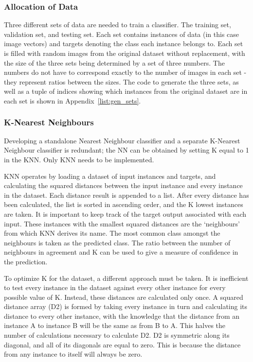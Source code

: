  

\subsubsection{Allocation of Data}

Three different sets of data are needed to train a classifier. The training set, validation set, and testing set. Each set contains instances of data (in this case image vectors) and targets denoting the class each instance belongs to. Each set is filled with random images from the original dataset without replacement, with the size of the three sets being determined by a set of three numbers. The numbers do not have to correspond exactly to the number of images in each set - they represent ratios between the sizes. The code to generate the three sets, as well as a tuple of indices showing which instances from the original dataset are in each set is shown in Appendix~\ref{list:gen_sets}.

\subsubsection{K-Nearest Neighbours}\label{sec:best_k}
Developing a standalone Nearest Neighbour classifier and a separate K-Nearest Neighbour classifier is redundant; the NN can be obtained by setting K equal to 1 in the KNN. Only KNN needs to be implemented.

KNN operates by loading a dataset of input instances and targets, and calculating the squared distances between the input instance and every instance in the dataset. Each distance result is appended to a list. After every distance has been calculated, the list is sorted in ascending order, and the K lowest instances are taken. It is important to keep track of the target output associated with each input. These instances with the smallest squared distances are the `neighbours' from which KNN derives its name. The most common class amongst the neighbours is taken as the predicted class. The ratio between the number of neighbours in agreement and K can be used to give a measure of confidence in the prediction.

To optimize K for the dataset, a different approach must be taken. It is inefficient to test every instance in the dataset against every other instance for every possible value of K. Instead, these distances are calculated only once. A squared distance array (D2) is formed by taking every instance in turn and calculating its distance to every other instance, with the knowledge that the distance from an instance A to instance B will be the same as from B to A. This halves the number of calculations necessary to calculate D2. D2 is symmetric along its diagonal, and all of its diagonals are equal to zero. This is because the distance from any instance to itself will always be zero. \\

